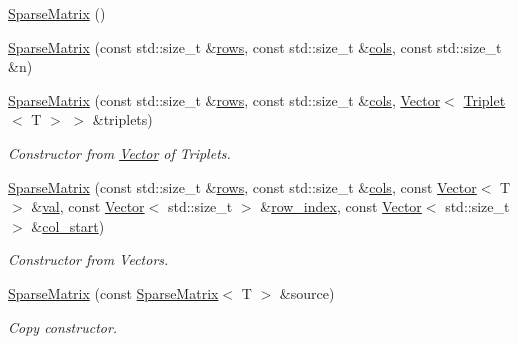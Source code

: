 \begin{DoxyCompactItemize}
\item 
\hyperlink{classLuna_1_1SparseMatrix_a147a686225e3df44b5a54bc63148406e}{Sparse\+Matrix} ()
\item 
\hyperlink{classLuna_1_1SparseMatrix_a8d3269958ed81af2b9b17bb79806cec1}{Sparse\+Matrix} (const std\+::size\+\_\+t \&\hyperlink{classLuna_1_1SparseMatrix_a970319496e5f0b963e4810f2ecbd93b6}{rows}, const std\+::size\+\_\+t \&\hyperlink{classLuna_1_1SparseMatrix_aff9e25ce05b5d11c3490f37fcd2ccfb0}{cols}, const std\+::size\+\_\+t \&n)
\item 
\hyperlink{classLuna_1_1SparseMatrix_ab698bd7ea02f6ab52f6b874fdefa84df}{Sparse\+Matrix} (const std\+::size\+\_\+t \&\hyperlink{classLuna_1_1SparseMatrix_a970319496e5f0b963e4810f2ecbd93b6}{rows}, const std\+::size\+\_\+t \&\hyperlink{classLuna_1_1SparseMatrix_aff9e25ce05b5d11c3490f37fcd2ccfb0}{cols}, \hyperlink{classLuna_1_1Vector}{Vector}$<$ \hyperlink{classLuna_1_1Triplet}{Triplet}$<$ T $>$ $>$ \&triplets)
\begin{DoxyCompactList}\small\item\em Constructor from \hyperlink{classLuna_1_1Vector}{Vector} of Triplets. \end{DoxyCompactList}\item 
\hyperlink{classLuna_1_1SparseMatrix_a06f2dbd99a7fb6c37f4bacdd886bf411}{Sparse\+Matrix} (const std\+::size\+\_\+t \&\hyperlink{classLuna_1_1SparseMatrix_a970319496e5f0b963e4810f2ecbd93b6}{rows}, const std\+::size\+\_\+t \&\hyperlink{classLuna_1_1SparseMatrix_aff9e25ce05b5d11c3490f37fcd2ccfb0}{cols}, const \hyperlink{classLuna_1_1Vector}{Vector}$<$ T $>$ \&\hyperlink{classLuna_1_1SparseMatrix_ac22d87e2fb618c6140c579bc72dd503b}{val}, const \hyperlink{classLuna_1_1Vector}{Vector}$<$ std\+::size\+\_\+t $>$ \&\hyperlink{classLuna_1_1SparseMatrix_a3a430b487f83ac9ef35ed322e1b94c29}{row\+\_\+index}, const \hyperlink{classLuna_1_1Vector}{Vector}$<$ std\+::size\+\_\+t $>$ \&\hyperlink{classLuna_1_1SparseMatrix_a5183843e7b13b0b359a9c98a91b30f6a}{col\+\_\+start})
\begin{DoxyCompactList}\small\item\em Constructor from Vectors. \end{DoxyCompactList}\item 
\hyperlink{classLuna_1_1SparseMatrix_a34b67d3b42dcc132e0806a8d9958b4b2}{Sparse\+Matrix} (const \hyperlink{classLuna_1_1SparseMatrix}{Sparse\+Matrix}$<$ T $>$ \&source)
\begin{DoxyCompactList}\small\item\em Copy constructor. \end{DoxyCompactList}\item 

\end{DoxyCompactItemize}
